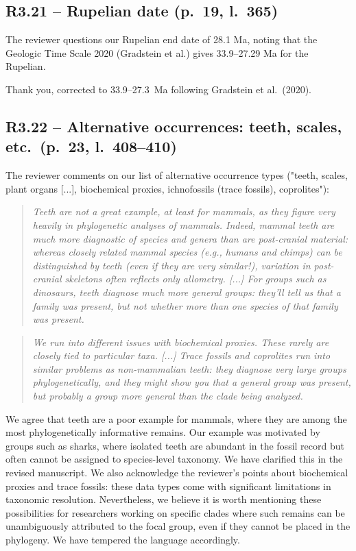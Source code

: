 \documentclass[11pt]{article}
\newenvironment{RC}{\begin{quote}\itshape}{\end{quote}}
\newcommand{\response}[1]{\noindent\textcolor{resp}{#1}\medskip}
\begin{document}
\subsection*{R3.21 -- Rupelian date (p.\ 19, l.\ 365)}

The reviewer questions our Rupelian end date of 28.1 Ma, noting that the Geologic Time Scale 2020 (Gradstein et al.) gives 33.9--27.29 Ma for the Rupelian.

\response{Thank you, corrected to 33.9--27.3~Ma following Gradstein et al.\ (2020).}

\subsection*{R3.22 -- Alternative occurrences: teeth, scales, etc.\ (p.\ 23, l.\ 408--410)}

The reviewer comments on our list of alternative occurrence types ("teeth, scales, plant organs [...], biochemical proxies, ichnofossils (trace fossils), coprolites"):

\begin{RC}
Teeth are not a great example, at least for mammals, as they figure very heavily in phylogenetic analyses of mammals. Indeed, mammal teeth are much more diagnostic of species and genera than are post-cranial material: whereas closely related mammal species (e.g., humans and chimps) can be distinguished by teeth (even if they are very similar!), variation in post-cranial skeletons often reflects only allometry. [...] For groups such as dinosaurs, teeth diagnose much more general groups: they'll tell us that a family was present, but not whether more than one species of that family was present.
\end{RC}

\begin{RC}
We run into different issues with biochemical proxies. These rarely are closely tied to particular taxa. [...] Trace fossils and coprolites run into similar problems as non-mammalian teeth: they diagnose very large groups phylogenetically, and they might show you that a general group was present, but probably a group more general than the clade being analyzed.
\end{RC}

\response{We agree that teeth are a poor example for mammals, where they are among the most phylogenetically informative remains. Our example was motivated by groups such as sharks, where isolated teeth are abundant in the fossil record but often cannot be assigned to species-level taxonomy. We have clarified this in the revised manuscript. We also acknowledge the reviewer's points about biochemical proxies and trace fossils: these data types come with significant limitations in taxonomic resolution. Nevertheless, we believe it is worth mentioning these possibilities for researchers working on specific clades where such remains can be unambiguously attributed to the focal group, even if they cannot be placed in the phylogeny. We have tempered the language accordingly.}
\end{document}
